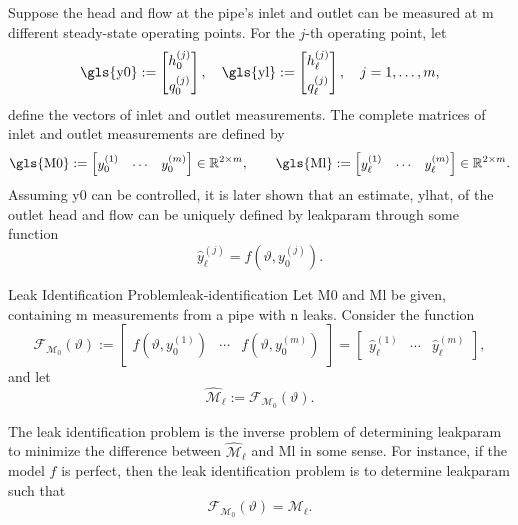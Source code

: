 Suppose the head and flow at the pipe's inlet and outlet can be measured at \gls{m} different steady-state operating points. For the $j$-th operating point, let
\begin{equation*}
\text{\gls{y0}} :=\begin{bmatrix}
    h_0^{(j)} \\[0.4em]
    q_0^{(j)}
\end{bmatrix}, \quad
\text{\gls{yl}} := \begin{bmatrix}
    h_{\ell}^{(j)} \\[0.4em]
    q_{\ell}^{(j)}
\end{bmatrix}, \quad
j=1,\dots,m,
\end{equation*}
define the vectors of inlet and outlet measurements. The complete matrices of inlet and outlet measurements are defined by
\[
\text{\gls{M0}}
:=
\begin{bmatrix}
y_0^{(1)} & \cdots & y_0^{(m)}
\end{bmatrix} \in\mathbb{R}^{2\times m},
\qquad
\text{\gls{Ml}}
:=
\begin{bmatrix}
y_{\ell}^{(1)} & \cdots & y_{\ell}^{(m)}
\end{bmatrix} \in\mathbb{R}^{2\times m}.
\]
Assuming \gls{y0} can be controlled, it is later shown that an estimate, \gls{ylhat}, of the outlet head and flow can be uniquely defined by \gls{leakparam} through some function
\begin{equation*}
    \hat{y}_\ell^{(j)} = f(\vartheta,y_0^{(j)}).
\end{equation*}

\vspace{3mm}
\begin{definition}{Leak Identification Problem}{leak-identification}
Let \gls{M0} and \gls{Ml} be given, containing \gls{m} measurements from a pipe with \gls{n} leaks. Consider the function
\[
\mathcal{F}_{\mathcal{M}_0}(\vartheta) := \begin{bmatrix}
    f(\vartheta,y_0^{(1)}) & \cdots & f(\vartheta,y_0^{(m)})
\end{bmatrix} =
\begin{bmatrix}
\hat{y}_{\ell}^{(1)} & \cdots & \hat{y}_{\ell}^{(m)}
\end{bmatrix},
\]
and let
\begin{equation*}
    \widehat{\mathcal{M}}_\ell := \mathcal{F}_{\mathcal{M}_0}(\vartheta).
\end{equation*}

The leak identification problem is the inverse problem of determining \gls{leakparam} to minimize the difference between $\widehat{\mathcal{M}}_\ell$ and \gls{Ml} in some sense. For instance, if the model $f$ is perfect, then the leak identification problem is to determine \gls{leakparam} such that
\[
\mathcal{F}_{\mathcal{M}_0}(\vartheta)=\mathcal{M}_\ell.
\]
\end{definition}
\vspace{3mm}

